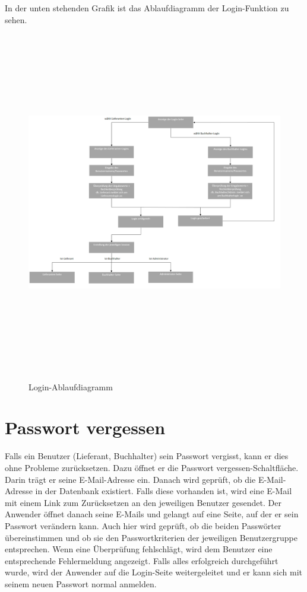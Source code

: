 \newpage
In der unten stehenden Grafik ist das Ablaufdiagramm der Login-Funktion zu sehen.
\begin{figure}[!h]
    \centering
    \includegraphics[width=17cm, height=15cm]{figures/login.jpg}
    \label{fig:login}
    \caption{Login-Ablaufdiagramm}
\end{figure}
\newpage

\section{Passwort vergessen}
Falls ein Benutzer (Lieferant, Buchhalter) sein Passwort vergisst, kann er dies ohne Probleme zurücksetzen. Dazu öffnet er die \glqq Passwort vergessen\grqq -Schaltfläche. Darin trägt er seine E-Mail-Adresse ein. Danach wird geprüft, ob die E-Mail-Adresse in der Datenbank existiert. Falls diese vorhanden ist, wird eine E-Mail mit einem Link zum Zurücksetzen an den jeweiligen Benutzer gesendet. Der Anwender öffnet danach seine E-Mails und gelangt auf eine Seite, auf der er sein Passwort verändern kann. Auch hier wird geprüft, ob die beiden Passwörter übereinstimmen und ob sie den Passwortkriterien der jeweiligen Benutzergruppe entsprechen. Wenn eine Überprüfung fehlschlägt, wird dem Benutzer eine entsprechende Fehlermeldung angezeigt. Falls alles erfolgreich durchgeführt wurde, wird der Anwender auf die Login-Seite weitergeleitet und er kann sich mit seinem neuen Passwort normal anmelden. 

